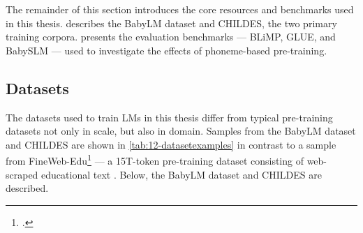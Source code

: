 The remainder of this section introduces the core resources and benchmarks used in this thesis.  describes the BabyLM dataset and CHILDES, the two primary training corpora.  presents the evaluation benchmarks --- BLiMP, GLUE, and BabySLM --- used to investigate the effects of phoneme-based pre-training.



\subsection{Datasets}\label{sec:12-datasets}

The datasets used to train LMs in this thesis differ from typical pre-training datasets not only in scale, but also in domain. Samples from the BabyLM dataset and CHILDES are shown in \cref{tab:12-datasetexamples} in contrast to a sample from FineWeb-Edu\footnote{\href{https://huggingface.co/datasets/HuggingFaceFW/fineweb-edu}{}.} --- a 15T-token pre-training dataset consisting of web-scraped educational text \citep{penedo2024finewebdatasetsdecantingweb}. Below, the BabyLM dataset and CHILDES are described.

